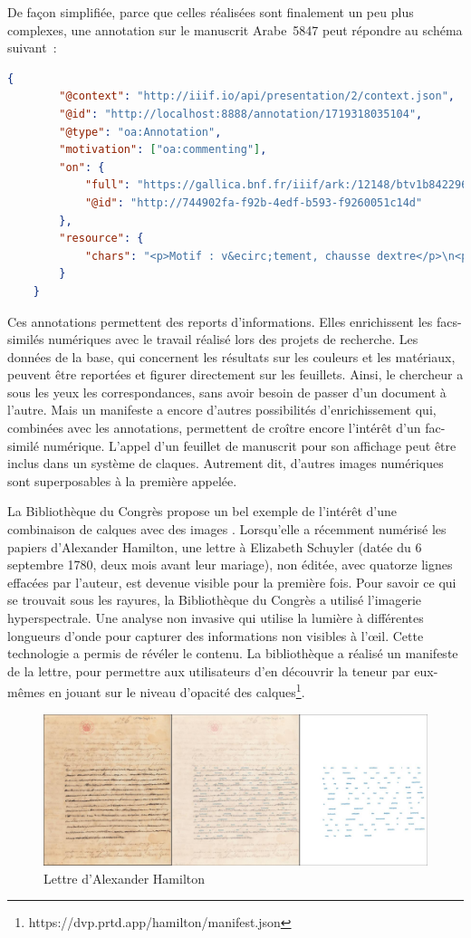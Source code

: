 De façon simplifiée, parce que celles réalisées sont finalement un peu plus complexes, une annotation sur le manuscrit Arabe 5847 peut répondre au schéma suivant~:
\begin{lstlisting}[language=json]
	{
		"@context": "http://iiif.io/api/presentation/2/context.json",
		"@id": "http://localhost:8888/annotation/1719318035104",
		"@type": "oa:Annotation",
		"motivation": ["oa:commenting"],
		"on": {
			"full": "https://gallica.bnf.fr/iiif/ark:/12148/btv1b8422965p/canvas/f34",
			"@id": "http://744902fa-f92b-4edf-b593-f9260051c14d"
		},
		"resource": {
			"chars": "<p>Motif : v&ecirc;tement, chausse dextre</p>\n<p>Couleur : rouge</p>\n<p>Mat&eacute;riau : ocre rouge</p>"
		}
	}
\end{lstlisting}

Ces annotations permettent des reports d’informations. Elles enrichissent les facs-similés numériques avec le travail réalisé lors des projets de recherche. Les données de la base, qui concernent les résultats sur les couleurs et les matériaux, peuvent être reportées et figurer directement sur les feuillets. Ainsi, le chercheur a sous les yeux les correspondances, sans avoir besoin de passer d’un document à l’autre. Mais un manifeste  a encore d’autres possibilités d’enrichissement qui, combinées avec les annotations, permettent de croître encore l’intérêt d’un fac-similé numérique. L’appel d’un feuillet de manuscrit pour son affichage peut être inclus dans un système de claques. Autrement dit, d’autres images numériques sont superposables à la première appelée.\par
La Bibliothèque du Congrès propose un bel exemple de l’intérêt d’une combinaison de calques avec des images . Lorsqu’elle a récemment numérisé les papiers d’Alexander Hamilton, une lettre à Elizabeth Schuyler (datée du 6 septembre 1780, deux mois avant leur mariage), non éditée, avec quatorze lignes effacées par l’auteur, est devenue visible pour la première fois. Pour savoir ce qui se trouvait sous les rayures, la Bibliothèque du Congrès a utilisé l'imagerie hyperspectrale. Une analyse non invasive qui utilise la lumière à différentes longueurs d'onde pour capturer des informations non visibles à l'œil. Cette technologie a permis de révéler le contenu. La bibliothèque a réalisé un manifeste  de la lettre, pour permettre aux utilisateurs d’en découvrir la teneur par eux-mêmes en jouant sur le niveau d’opacité des calques\footnote{https://dvp.prtd.app/hamilton/manifest.json}.
\begin{figure}[H]
	\centering
	\includegraphics[width=\textwidth]{./textes/chap4/iiif-calque.jpg}
	\caption{Lettre d'Alexander Hamilton}
	\label{fig:info}
\end{figure}

